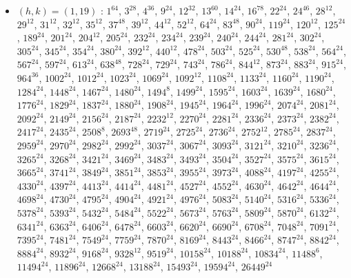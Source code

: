 \begin{itemize}
\item $(h,k)=(1,19)$ : $1^{64}$, $3^{28}$, $4^{36}$, $9^{24}$, $12^{32}$, $13^{60}$, $14^{24}$, $16^{78}$, $22^{24}$, $24^{46}$, $28^{12}$, $29^{12}$, $31^{12}$, $32^{12}$, $35^{12}$, $37^{48}$, $39^{12}$, $44^{12}$, $52^{12}$, $64^{24}$, $83^{48}$, $90^{24}$, $119^{24}$, $120^{12}$, $125^{24}$, $189^{24}$, $201^{24}$, $204^{12}$, $205^{24}$, $232^{24}$, $234^{24}$, $239^{24}$, $240^{24}$, $244^{24}$, $281^{24}$, $302^{24}$, $305^{24}$, $345^{24}$, $354^{24}$, $380^{24}$, $392^{12}$, $440^{12}$, $478^{24}$, $503^{24}$, $525^{24}$, $530^{48}$, $538^{24}$, $564^{24}$, $567^{24}$, $597^{24}$, $613^{24}$, $638^{48}$, $728^{24}$, $729^{24}$, $743^{24}$, $786^{24}$, $844^{12}$, $873^{24}$, $883^{24}$, $915^{24}$, $964^{36}$, $1002^{24}$, $1012^{24}$, $1023^{24}$, $1069^{24}$, $1092^{12}$, $1108^{24}$, $1133^{24}$, $1160^{24}$, $1190^{24}$, $1284^{24}$, $1448^{24}$, $1467^{24}$, $1480^{24}$, $1494^{8}$, $1499^{24}$, $1595^{24}$, $1603^{24}$, $1639^{24}$, $1680^{24}$, $1776^{24}$, $1829^{24}$, $1837^{24}$, $1880^{24}$, $1908^{24}$, $1945^{24}$, $1964^{24}$, $1996^{24}$, $2074^{24}$, $2081^{24}$, $2092^{24}$, $2149^{24}$, $2156^{24}$, $2187^{24}$, $2232^{12}$, $2270^{24}$, $2281^{24}$, $2336^{24}$, $2373^{24}$, $2382^{24}$, $2417^{24}$, $2435^{24}$, $2508^{8}$, $2693^{48}$, $2719^{24}$, $2725^{24}$, $2736^{24}$, $2752^{12}$, $2785^{24}$, $2837^{24}$, $2959^{24}$, $2970^{24}$, $2982^{24}$, $2992^{24}$, $3037^{24}$, $3067^{24}$, $3093^{24}$, $3121^{24}$, $3210^{24}$, $3236^{24}$, $3265^{24}$, $3268^{24}$, $3421^{24}$, $3469^{24}$, $3483^{24}$, $3493^{24}$, $3504^{24}$, $3527^{24}$, $3575^{24}$, $3615^{24}$, $3665^{24}$, $3741^{24}$, $3849^{24}$, $3851^{24}$, $3853^{24}$, $3955^{24}$, $3973^{24}$, $4088^{24}$, $4197^{24}$, $4255^{24}$, $4330^{24}$, $4397^{24}$, $4413^{24}$, $4414^{24}$, $4481^{24}$, $4527^{24}$, $4552^{24}$, $4630^{24}$, $4642^{24}$, $4644^{24}$, $4698^{24}$, $4730^{24}$, $4795^{24}$, $4904^{24}$, $4921^{24}$, $4976^{24}$, $5083^{24}$, $5140^{24}$, $5316^{24}$, $5336^{24}$, $5378^{24}$, $5393^{24}$, $5432^{24}$, $5484^{24}$, $5522^{24}$, $5673^{24}$, $5763^{24}$, $5809^{24}$, $5870^{24}$, $6132^{24}$, $6341^{24}$, $6363^{24}$, $6406^{24}$, $6478^{24}$, $6603^{24}$, $6620^{24}$, $6690^{24}$, $6708^{24}$, $7048^{24}$, $7091^{24}$, $7395^{24}$, $7481^{24}$, $7549^{24}$, $7759^{24}$, $7870^{24}$, $8169^{24}$, $8443^{24}$, $8466^{24}$, $8747^{24}$, $8842^{24}$, $8884^{24}$, $8932^{24}$, $9168^{24}$, $9328^{12}$, $9519^{24}$, $10158^{24}$, $10188^{24}$, $10834^{24}$, $11488^{6}$, $11494^{24}$, $11896^{24}$, $12668^{24}$, $13188^{24}$, $15493^{24}$, $19594^{24}$, $26449^{24}$

\end{itemize}
